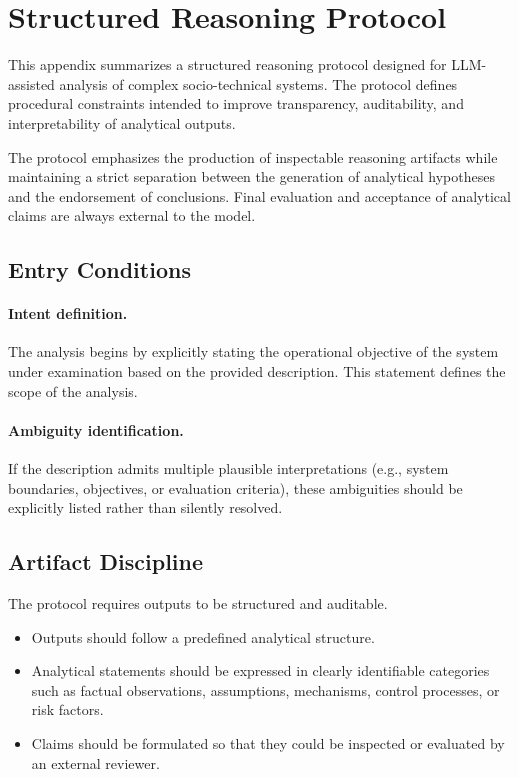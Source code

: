\section{Structured Reasoning Protocol}
\renewcommand{\appendixname}{}
This appendix summarizes a structured reasoning protocol designed for
LLM-assisted analysis of complex socio-technical systems. The protocol
defines procedural constraints intended to improve transparency,
auditability, and interpretability of analytical outputs.

The protocol emphasizes the production of inspectable reasoning artifacts
while maintaining a strict separation between the generation of analytical
hypotheses and the endorsement of conclusions. Final evaluation and
acceptance of analytical claims are always external to the model.

\subsection{Entry Conditions}

\paragraph{Intent definition.}
The analysis begins by explicitly stating the operational objective of the
system under examination based on the provided description. This statement
defines the scope of the analysis.

\paragraph{Ambiguity identification.}
If the description admits multiple plausible interpretations (e.g.,
system boundaries, objectives, or evaluation criteria), these ambiguities
should be explicitly listed rather than silently resolved.

\subsection{Artifact Discipline}

The protocol requires outputs to be structured and auditable.

\begin{itemize}
\item Outputs should follow a predefined analytical structure.
\item Analytical statements should be expressed in clearly identifiable
categories such as factual observations, assumptions, mechanisms,
control processes, or risk factors.
\item Claims should be formulated so that they could be inspected or
evaluated by an external reviewer.
\end{itemize}

